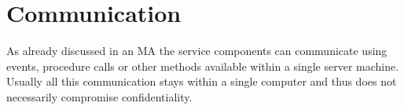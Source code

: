 



\section{Communication}
\begin{sloppypar}
    As already discussed in an MA the service components can communicate using 
    events, procedure calls or other methods available within a single server 
    machine. Usually all this communication stays within a single computer and 
    thus does not necessarily compromise confidentiality.
\end{sloppypar}




